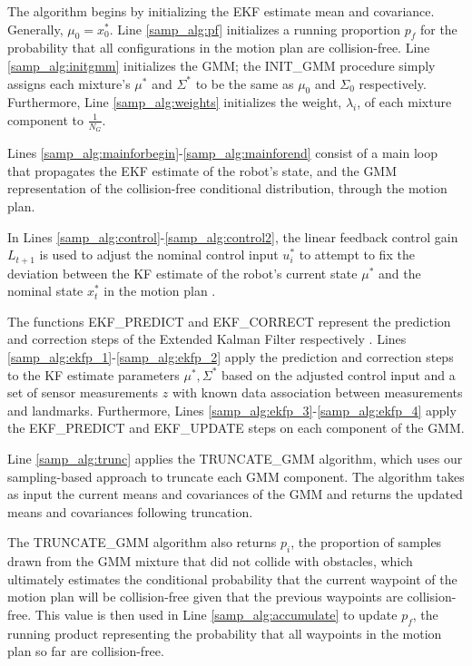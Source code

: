 \documentclass[journal]{IEEEtran}
\begin{document}
The algorithm begins by initializing the EKF estimate mean and covariance. Generally, $\mu_0 = x_0^*$. Line \ref{samp_alg:pf} initializes a running proportion $p_f$ for the probability that all configurations in the motion plan are collision-free. Line \ref{samp_alg:initgmm} initializes the GMM; the INIT\_GMM procedure simply assigns each mixture's $\mu^*$ and $\Sigma^*$ to be the same as $\mu_0$ and $\Sigma_0$ respectively. Furthermore, Line \ref{samp_alg:weights} initializes the weight, $\lambda_i$, of each mixture component to $\frac{1}{N_G}$.

Lines \ref{samp_alg:mainforbegin}-\ref{samp_alg:mainforend} consist of a main loop that propagates the EKF estimate of the robot's state, and the GMM representation of the collision-free conditional distribution, through the motion plan.

In Lines \ref{samp_alg:control}-\ref{samp_alg:control2}, the linear feedback control gain $L_{t+1}$ is used to adjust the nominal control input $u_i^*$ to attempt to fix the deviation between the KF estimate of the robot's current state $\mu^*$ and the nominal state $x_t^*$ in the motion plan \cite{IEEEhowto:stengel}. 

The functions EKF\_PREDICT and EKF\_CORRECT represent the prediction and correction steps of the Extended Kalman Filter respectively \cite{IEEEhowto:thrun}. Lines \ref{samp_alg:ekfp_1}-\ref{samp_alg:ekfp_2} apply the prediction and correction steps to the KF estimate parameters $\mu^*,\Sigma^*$ based on the adjusted control input and a set of sensor measurements $z$ with known data association between measurements and landmarks. Furthermore, Lines \ref{samp_alg:ekfp_3}-\ref{samp_alg:ekfp_4} apply the EKF\_PREDICT and EKF\_UPDATE steps on each component of the GMM.

Line \ref{samp_alg:trunc} applies the TRUNCATE\_GMM algorithm, which uses our sampling-based approach to truncate each GMM component. The algorithm takes as input the current means and covariances of the GMM and returns the updated means and covariances following truncation.

The TRUNCATE\_GMM algorithm also returns $p_i$, the proportion of samples drawn from the GMM mixture that did not collide with obstacles, which ultimately estimates the conditional probability that the current waypoint of the motion plan will be collision-free given that the previous waypoints are collision-free. This value is then used in Line \ref{samp_alg:accumulate} to update $p_f$, the running product representing the probability that all waypoints in the motion plan so far are collision-free.
\end{document}
